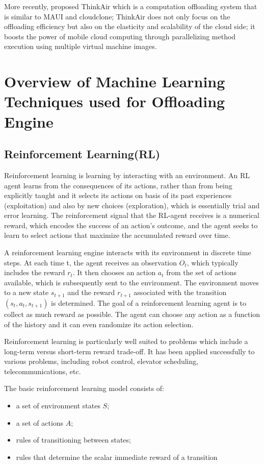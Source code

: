 \documentclass[12pt]{report}
\begin{document}
More recently, \cite{kosta2012thinkair} proposed ThinkAir which is a
computation offloading system that is similar to MAUI and
cloudclone; ThinkAir does not only focus on the offloading
efficiency but also on the elasticity and scalability of the
cloud side; it boosts the power of mobile cloud computing
through parallelizing method execution using multiple
virtual machine images. 


\chapter{Overview of Machine Learning Techniques used for Offloading Engine} %

\section{Reinforcement Learning(RL)}
Reinforcement learning is learning by interacting with an environment. An RL agent learns from the consequences of its actions, rather than from being explicitly taught and it selects its actions on basis of its past experiences (exploitation) and also by new choices (exploration), which is essentially trial and error learning. The reinforcement signal that the RL-agent receives is a numerical reward, which encodes the success of an action's outcome, and the agent seeks to learn to select actions that maximize the accumulated reward over time.\par
A reinforcement learning engine interacts with its environment in discrete time steps. At each time t, the agent receives an observation $O_t$, which typically includes the reward $r_t$. It then chooses an action $a_t$ from the set of actions available, which is subsequently sent to the environment. The environment moves to a new state $s_{t+1}$ and the reward $r_{t+1}$ associated with the transition $(s_t,a_t,s_{t+1})$ is determined. The goal of a reinforcement learning agent is to collect as much reward as possible. The agent can choose any action as a function of the history and it can even randomize its action selection.  \par
Reinforcement learning is particularly well suited to problems which include a long-term versus short-term reward trade-off. It has been applied successfully to various problems, including robot control, elevator scheduling, telecommunications, etc. \par
The basic reinforcement learning model consists of:
\begin{itemize}
    \item a set of environment states $S$;
    \item a set of actions $A$;
    \item rules of transitioning between states;
    \item rules that determine the scalar immediate reward of a transition
\end{itemize}
\end{document}
